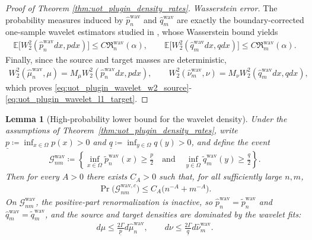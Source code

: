 \documentclass[11pt,reqno]{amsart}
\newtheorem{lemma}[theorem]{Lemma}
\theoremstyle{definition}
\renewcommand{\hat}{\widehat}
\renewcommand{\tilde}{\widetilde}
\newcommand{\Ep}{\mathbb{E}}
\begin{document}
\begin{proof}[Proof of Theorem \ref{thm:uot_plugin_density_rates}]
\smallskip
\noindent\emph{Wasserstein error.}
The probability measures induced by $\hat p_n^{\mathrm{wav}}$ and $\hat q_m^{\mathrm{wav}}$ are exactly the boundary-corrected one-sample wavelet estimators studied in \cite[Lemma 30]{manole2024plugin}, whose Wasserstein bound yields
\begin{align*}
    \Ep\bigl[W_2^2(\hat p_n^{\mathrm{wav}}dx,p dx)\bigr]
    \le C\mathfrak R_n^{\mathrm{wav}}(\alpha),
    \qquad
    \Ep\bigl[W_2^2(\hat q_m^{\mathrm{wav}}dx,q dx)\bigr]
    \le C\mathfrak R_m^{\mathrm{wav}}(\alpha).
\end{align*}
Finally, since the source and target masses are deterministic,
\begin{align*}
    W_2^2(\hat\mu_n^{\mathrm{wav}},\mu) = M_\mu W_2^2(\hat p_n^{\mathrm{wav}}dx,p dx),
    \qquad
    W_2^2(\hat\nu_m^{\mathrm{wav}},\nu) = M_\nu W_2^2(\hat q_m^{\mathrm{wav}}dx,q dx),
\end{align*}
which proves \eqref{eq:uot_plugin_wavelet_w2_source}-\eqref{eq:uot_plugin_wavelet_l1_target}.
\end{proof}


\begin{lemma}[High-probability lower bound for the wavelet density]
\label{lem:uot_wavelet_lower_bound_event}
Under the assumptions of Theorem~\ref{thm:uot_plugin_density_rates}, write $\underline p\coloneqq \inf_{x\in\Omega}p(x)>0$ and $\underline q\coloneqq \inf_{y\in\Omega}q(y)>0$, and define the event
\begin{align*}
    \mathcal G_{nm}^{\mathrm{wav}}
    \coloneqq
    \left\{
        \inf_{x\in\Omega}\tilde p_n^{\mathrm{wav}}(x)\ge \frac{\underline p}{2}
        \quad \text{and}\quad
        \inf_{y\in\Omega}\tilde q_m^{\mathrm{wav}}(y)\ge \frac{\underline q}{2}
    \right\}.
\end{align*}
Then for every $A>0$ there exists $C_A>0$ such that, for all sufficiently large $n,m$,
\begin{align}
\label{eq:uot_wavelet_lower_bound_event}
    \Pr\bigl(\mathcal G_{nm}^{\mathrm{wav},c}\bigr) \le C_A\bigl(n^{-A}+m^{-A}\bigr).
\end{align}
On $\mathcal G_{nm}^{\mathrm{wav}}$, the positive-part renormalization is inactive, so $\hat p_n^{\mathrm{wav}}=\tilde p_n^{\mathrm{wav}}$ and $\hat q_m^{\mathrm{wav}}=\tilde q_m^{\mathrm{wav}}$, and the source and target densities are dominated by the wavelet fits:
\begin{align}
\label{eq:wavelet_density_domination}
    d\mu \le \frac{2\Gamma}{\underline p} d\hat\mu_n^{\mathrm{wav}},
    \qquad
    d\nu \le \frac{2\Gamma}{\underline q} d\hat\nu_m^{\mathrm{wav}}.
\end{align}
\end{lemma}
\end{document}
